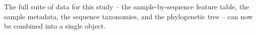 The full suite of data for this study -- the sample-by-sequence
feature table, the sample metadata, the sequence taxonomies, and the
phylogenetic tree -- can now be combined into a single object.

\begin{knitrout}
\color{fgcolor}\begin{kframe}
\begin{alltt}
 \hlkwb{<-} \hlstd{(} 
                 \hlstd{=} \hlstd{),} \hlopt{$}
\end{alltt}
\end{kframe}
\end{knitrout}
